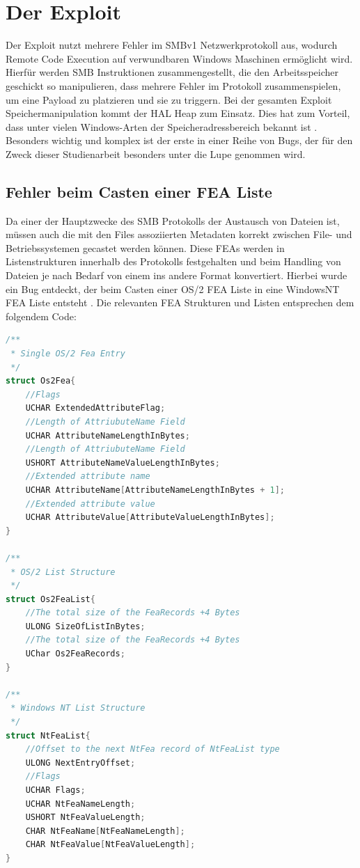 \documentclass[DIV=12,headings=normal,pdftex,headinclude=false,footinclude=false,final]{scrreprt}
\begin{document}
\chapter{Der Exploit}
Der Exploit nutzt mehrere Fehler im SMBv1 Netzwerkprotokoll aus, wodurch Remote Code Execution auf verwundbaren Windows Maschinen ermöglicht wird.\\ Hierfür werden SMB Instruktionen zusammengestellt, die den Arbeitsspeicher geschickt so manipulieren, dass mehrere Fehler im Protokoll zusammenspielen, um eine Payload zu platzieren und sie zu triggern\cite{Medium}. Bei der gesamten Exploit Speichermanipulation kommt der HAL Heap zum Einsatz. Dies hat zum Vorteil, dass unter vielen Windows-Arten der Speicheradressbereich bekannt ist \cite{GH:FEA}. Besonders wichtig und komplex ist der erste in einer Reihe von Bugs, der für den Zweck dieser Studienarbeit besonders unter die Lupe genommen wird.

\section{Fehler beim Casten einer FEA Liste}
Da einer der Hauptzwecke des SMB Protokolls der Austausch von Dateien ist, müssen auch die mit den Files assoziierten Metadaten korrekt zwischen File- und Betriebssystemen gecastet werden können. Diese FEAs werden in Listenstrukturen innerhalb des Protokolls festgehalten und beim Handling von Dateien je nach Bedarf von einem ins andere Format konvertiert. Hierbei wurde ein Bug entdeckt, der beim Casten einer OS/2 FEA Liste in eine WindowsNT FEA Liste entsteht \cite{TM:EB}.
Die relevanten FEA Strukturen und Listen entsprechen dem folgendem Code:

\begin{lstlisting}[language=C,caption={Die zwei relevanten FEAs und exemplarisch die NTFEA-Liste},captionpos=b]
/**
 * Single OS/2 Fea Entry
 */
struct Os2Fea{
    //Flags
    UCHAR ExtendedAttributeFlag;
    //Length of AttriubuteName Field
    UCHAR AttributeNameLengthInBytes;
    //Length of AttriubuteName Field
    USHORT AttributeNameValueLengthInBytes;
    //Extended attribute name
    UCHAR AttributeName[AttributeNameLengthInBytes + 1];
    //Extended attribute value
    UCHAR AttributeValue[AttributeValueLengthInBytes]; 
}
 
/**
 * OS/2 List Structure
 */
struct Os2FeaList{
    //The total size of the FeaRecords +4 Bytes
    ULONG SizeOfListInBytes; 
    //The total size of the FeaRecords +4 Bytes
    UChar Os2FeaRecords;
}
 
/**
 * Windows NT List Structure
 */
struct NtFeaList{
    //Offset to the next NtFea record of NtFeaList type
    ULONG NextEntryOffset;
    //Flags
    UCHAR Flags;
    UCHAR NtFeaNameLength;
    USHORT NtFeaValueLength;
    CHAR NtFeaName[NtFeaNameLength];
    CHAR NtFeaValue[NtFeaValueLength];
}
\end{lstlisting}
\end{document}
